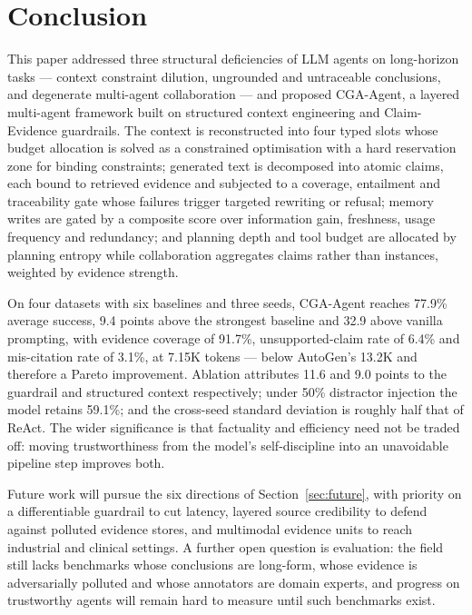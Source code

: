 \documentclass[journal,10pt,a4paper]{IEEEtran}
\begin{document}
\section{Conclusion}
\label{sec:conclusion}
This paper addressed three structural deficiencies of LLM agents on long-horizon tasks --- context constraint dilution, ungrounded and untraceable conclusions, and degenerate multi-agent collaboration --- and proposed CGA-Agent, a layered multi-agent framework built on structured context engineering and Claim-Evidence guardrails. The context is reconstructed into four typed slots whose budget allocation is solved as a constrained optimisation with a hard reservation zone for binding constraints; generated text is decomposed into atomic claims, each bound to retrieved evidence and subjected to a coverage, entailment and traceability gate whose failures trigger targeted rewriting or refusal; memory writes are gated by a composite score over information gain, freshness, usage frequency and redundancy; and planning depth and tool budget are allocated by planning entropy while collaboration aggregates claims rather than instances, weighted by evidence strength.

On four datasets with six baselines and three seeds, CGA-Agent reaches 77.9\% average success, 9.4 points above the strongest baseline and 32.9 above vanilla prompting, with evidence coverage of 91.7\%, unsupported-claim rate of 6.4\% and mis-citation rate of 3.1\%, at 7.15K tokens --- below AutoGen's 13.2K and therefore a Pareto improvement. Ablation attributes 11.6 and 9.0 points to the guardrail and structured context respectively; under 50\% distractor injection the model retains 59.1\%; and the cross-seed standard deviation is roughly half that of ReAct. The wider significance is that factuality and efficiency need not be traded off: moving trustworthiness from the model's self-discipline into an unavoidable pipeline step improves both.

Future work will pursue the six directions of Section~\ref{sec:future}, with priority on a differentiable guardrail to cut latency, layered source credibility to defend against polluted evidence stores, and multimodal evidence units to reach industrial and clinical settings. A further open question is evaluation: the field still lacks benchmarks whose conclusions are long-form, whose evidence is adversarially polluted and whose annotators are domain experts, and progress on trustworthy agents will remain hard to measure until such benchmarks exist.
\end{document}
